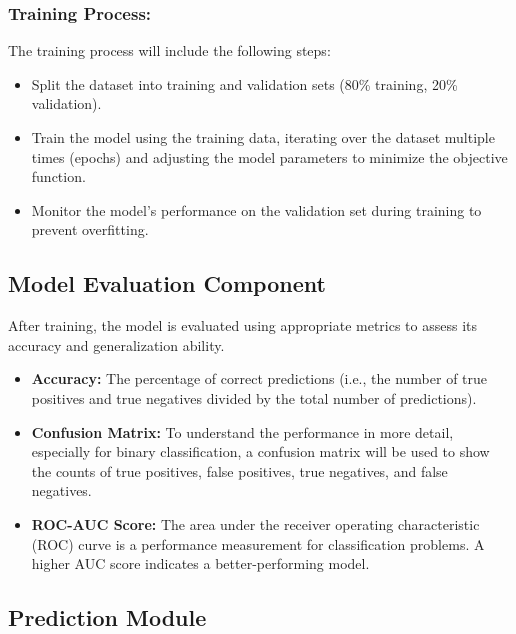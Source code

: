 \documentclass[15pt]{article}
\begin{document}
\subsubsection{Training Process:}

The training process will include the following steps:
\begin{itemize}
    \item Split the dataset into training and validation sets (80\% training, 20\% validation).
    \item Train the model using the training data, iterating over the dataset multiple times (epochs) and adjusting the model parameters to minimize the objective function.
    \item Monitor the model’s performance on the validation set during training to prevent overfitting.
\end{itemize}

\subsection{Model Evaluation Component}

After training, the model is evaluated using appropriate metrics to assess its accuracy and generalization ability.

\begin{itemize}
    \item \textbf{Accuracy:} The percentage of correct predictions (i.e., the number of true positives and true negatives divided by the total number of predictions).
    \item \textbf{Confusion Matrix:} To understand the performance in more detail, especially for binary classification, a confusion matrix will be used to show the counts of true positives, false positives, true negatives, and false negatives.
    \item \textbf{ROC-AUC Score:} The area under the receiver operating characteristic (ROC) curve is a performance measurement for classification problems. A higher AUC score indicates a better-performing model.
\end{itemize}

\subsection{Prediction Module}
\end{document}
